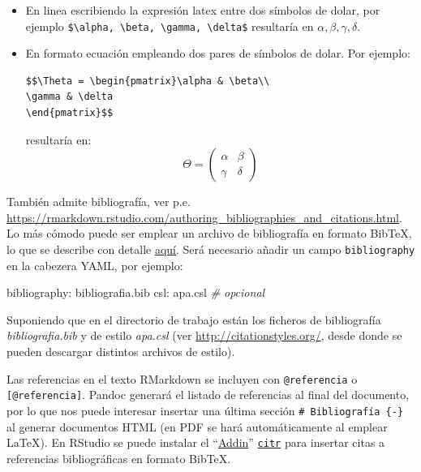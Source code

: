 \documentclass[]{book}
\newenvironment{Shaded}{\begin{snugshade}}{\end{snugshade}}
\newcommand{\CommentTok}[1]{\textcolor[rgb]{0.56,0.35,0.01}{\textit{#1}}}
\newcommand{\FunctionTok}[1]{\textcolor[rgb]{0.00,0.00,0.00}{#1}}
\newcommand{\AttributeTok}[1]{\textcolor[rgb]{0.77,0.63,0.00}{#1}}
\theoremstyle{definition}
\theoremstyle{definition}
\theoremstyle{definition}
\theoremstyle{remark}
\begin{document}
\begin{itemize}
\item
  En linea escribiendo la expresión latex entre dos símbolos de dolar,
  por ejemplo
  \texttt{\$\textbackslash{}alpha,\ \textbackslash{}beta,\ \textbackslash{}gamma,\ \textbackslash{}delta\$}
  resultaría en \(\alpha, \beta, \gamma, \delta\).
\item
  En formato ecuación empleando dos pares de símbolos de dolar. Por
  ejemplo:

\begin{verbatim}
$$\Theta = \begin{pmatrix}\alpha & \beta\\
\gamma & \delta
\end{pmatrix}$$
\end{verbatim}

  resultaría en: \[\Theta = \begin{pmatrix}\alpha & \beta\\
  \gamma & \delta
  \end{pmatrix}\]
\end{itemize}

También admite bibliografía, ver p.e.
\url{https://rmarkdown.rstudio.com/authoring_bibliographies_and_citations.html}.
Lo más cómodo puede ser emplear un archivo de bibliografía en formato
BibTeX, lo que se describe con detalle
\href{https://bookdown.org/yihui/bookdown/citations.html}{aquí}. Será
necesario añadir un campo \texttt{bibliography} en la cabezera YAML, por
ejemplo:

\begin{Shaded}
\begin{Highlighting}[]
\FunctionTok{bibliography:}\AttributeTok{ bibliografia.bib}
\FunctionTok{csl:}\AttributeTok{ apa.csl  }\CommentTok{# opcional}
\end{Highlighting}
\end{Shaded}

Suponiendo que en el directorio de trabajo están los ficheros de
bibliografía \emph{bibliografia.bib} y de estilo \emph{apa.csl} (ver
\url{http://citationstyles.org/}, desde donde se pueden descargar
distintos archivos de estilo).

Las referencias en el texto RMarkdown se incluyen con
\texttt{@referencia} o \texttt{{[}@referencia{]}}. Pandoc generará el
listado de referencias al final del documento, por lo que nos puede
interesar insertar una última sección \texttt{\#\ Bibliografía\ \{-\}}
al generar documentos HTML (en PDF se hará automáticamente al emplear
LaTeX). En RStudio se puede instalar el
``\href{https://rstudio.github.io/rstudioaddins/}{Addin}''
\href{https://github.com/crsh/citr}{\texttt{citr}} para insertar citas a
referencias bibliográficas en formato BibTeX.
\end{document}
